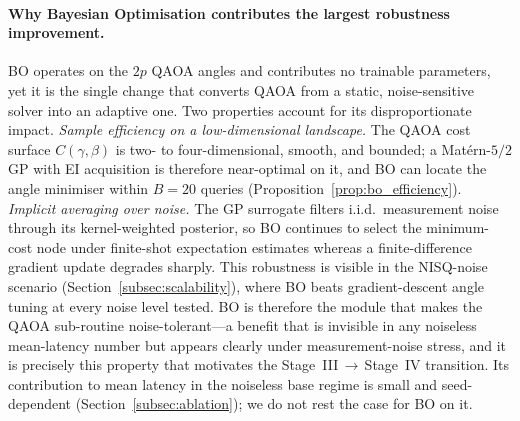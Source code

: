 \documentclass[11pt,a4paper]{article}
\theoremstyle{definition}
\begin{document}
\paragraph{Why Bayesian Optimisation contributes the largest robustness improvement.}
BO operates on the $2p$ QAOA angles and contributes no trainable parameters, yet it is the single change that converts QAOA from a static, noise-sensitive solver into an adaptive one. Two properties account for its disproportionate impact. \emph{Sample efficiency on a low-dimensional landscape.} The QAOA cost surface $C(\gamma,\beta)$ is two- to four-dimensional, smooth, and bounded; a Mat\'ern-$5/2$ GP with EI acquisition is therefore near-optimal on it, and BO can locate the angle minimiser within $B\!=\!20$ queries (Proposition~\ref{prop:bo_efficiency}). \emph{Implicit averaging over noise.} The GP surrogate filters i.i.d.\ measurement noise through its kernel-weighted posterior, so BO continues to select the minimum-cost node under finite-shot expectation estimates whereas a finite-difference gradient update degrades sharply. This robustness is visible in the NISQ-noise scenario (Section~\ref{subsec:scalability}), where BO beats gradient-descent angle tuning at every noise level tested. BO is therefore the module that makes the QAOA sub-routine noise-tolerant---a benefit that is invisible in any noiseless mean-latency number but appears clearly under measurement-noise stress, and it is precisely this property that motivates the Stage~III\,$\rightarrow$\,Stage~IV transition. Its contribution to mean latency in the noiseless base regime is small and seed-dependent (Section~\ref{subsec:ablation}); we do not rest the case for BO on it.
\end{document}

